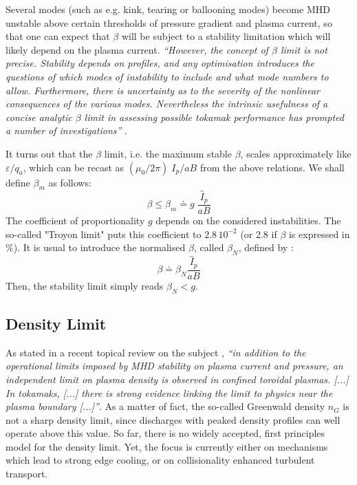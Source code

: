 Several modes (such as e.g. kink, tearing or ballooning modes) become MHD unstable above certain thresholds of pressure gradient and plasma current, so that one can expect that $\beta$ will be subject to a stability limitation which will likely depend on the plasma current. \emph{``However, the concept of $\beta$ limit is not precise. Stability depends on profiles, and any optimisation introduces the questions of which modes of instability to include and what mode numbers to allow. Furthermore, there is uncertainty as to the severity of the nonlinear consequences of the various modes. Nevertheless the intrinsic usefulness of a concise analytic $\beta$ limit in assessing possible tokamak performance has prompted a number of investigations''} \cite{Wesson2004}.

It turns out that the $\beta$ limit, i.e. the maximum stable $\beta$, scales approximately like $\varepsilon/q_a$, which can be recast as $(\mu_0/2\pi)\; I_p/aB$ from the above relations. We shall define $\beta_m$ as follows:
\begin{equation*}
\beta \leqslant \beta_m \doteq g\; \frac{\hat I_p}{a B}
\end{equation*}
The coefficient of proportionality $g$ depends on the considered instabilities. The so-called "Troyon limit" \cite{Troyon1984} puts this coefficient to $2.8\, 10^{-2}$ (or 2.8 if $\beta$ is expressed in $\%$).
It is usual to introduce the normalised $\beta$, called $\beta_N$, defined by \cite[eq.(13.146)]{Freidberg2007}:
\begin{equation}
\beta \doteq \beta_N \frac{\hat I_p}{a B}
\end{equation}
Then, the stability limit simply reads $\beta_N <g$.




\subsection{Density Limit}

As stated in a recent topical review on the subject \cite{Greenwald2002}, \emph{``in addition to the operational limits imposed by MHD stability on plasma current and pressure, an independent limit on plasma density is observed in confined toroidal plasmas. [...] In tokamaks, [...] there is strong evidence linking the limit to physics near the plasma boundary [...]''}. As a matter of fact, the so-called Greenwald density $n_G$ is not a sharp density limit, since discharges with peaked density profiles can well operate above this value. So far, there is no widely accepted, first principles model for the density limit. Yet, the focus is currently either on mechanisms which lead to strong edge cooling, or on collisionality enhanced turbulent transport.

